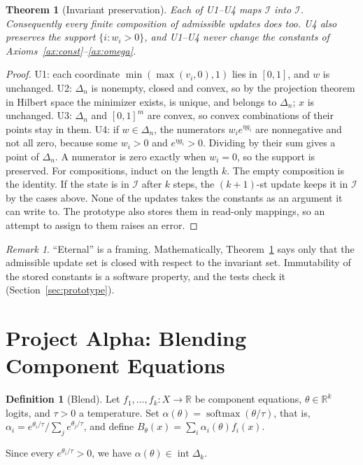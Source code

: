 \documentclass[11pt]{article}
\newtheorem{theorem}{Theorem}
\theoremstyle{definition}
\newtheorem{definition}{Definition}
\theoremstyle{remark}
\newtheorem{remark}{Remark}
\newcommand{\R}{\mathbb{R}}
\newcommand{\Simp}{\Delta}
\DeclareMathOperator{\softmax}{softmax}
\begin{document}
\begin{theorem}[Invariant preservation]\label{thm:veritas}
Each of U1--U4 maps $\mathcal I$ into $\mathcal I$. Consequently every finite composition of admissible updates does too. U4 also preserves the support $\{i:w_i>0\}$, and U1--U4 never change the constants of Axioms~\ref{ax:const}--\ref{ax:omega}.
\end{theorem}
\begin{proof}
U1: each coordinate $\min(\max(v_i,0),1)$ lies in $[0,1]$, and $w$ is unchanged.
U2: $\Simp_n$ is nonempty, closed and convex, so by the projection theorem in Hilbert space the minimizer exists, is unique, and belongs to $\Simp_n$; $x$ is unchanged.
U3: $\Simp_n$ and $[0,1]^m$ are convex, so convex combinations of their points stay in them.
U4: if $w\in\Simp_n$, the numerators $w_ie^{\eta g_i}$ are nonnegative and not all zero, because some $w_i>0$ and $e^{\eta g_i}>0$. Dividing by their sum gives a point of $\Simp_n$. A numerator is zero exactly when $w_i=0$, so the support is preserved.
For compositions, induct on the length $k$. The empty composition is the identity. If the state is in $\mathcal I$ after $k$ steps, the $(k+1)$-st update keeps it in $\mathcal I$ by the cases above. None of the updates takes the constants as an argument it can write to. The prototype also stores them in read-only mappings, so an attempt to assign to them raises an error.
\end{proof}

\begin{remark}
``Eternal'' is a framing. Mathematically, Theorem~\ref{thm:veritas} says only that the admissible update set is closed with respect to the invariant set. Immutability of the stored constants is a software property, and the tests check it (Section~\ref{sec:prototype}).
\end{remark}

\section{Project Alpha: Blending Component Equations}\label{sec:alpha}
\begin{definition}[Blend]
Let $f_1,\dots,f_k:X\to\R$ be component equations, $\theta\in\R^k$ logits, and $\tau>0$ a temperature. Set $\alpha(\theta)=\softmax(\theta/\tau)$, that is, $\alpha_i=e^{\theta_i/\tau}/\sum_je^{\theta_j/\tau}$, and define $B_\theta(x)=\sum_i\alpha_i(\theta)f_i(x)$.
\end{definition}
Since every $e^{\theta_i/\tau}>0$, we have $\alpha(\theta)\in\operatorname{int}\Simp_k$.
\end{document}
